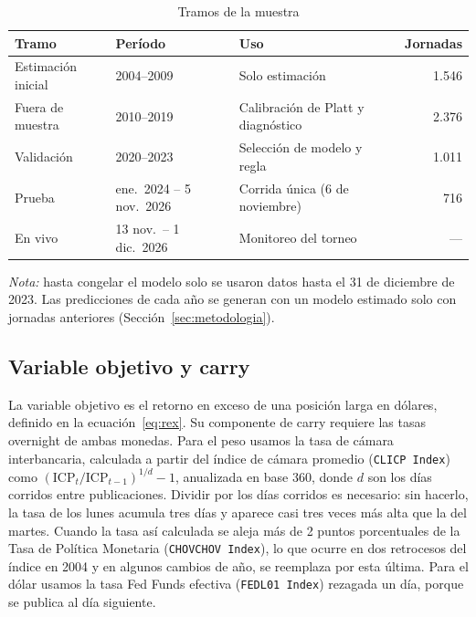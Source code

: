 \documentclass[11pt,a4paper]{article}
\begin{document}
\begin{table}[htbp]\centering
\caption{Tramos de la muestra}\label{tab:tramos}
\begin{threeparttable}
\begin{tabular}{lll r}
\toprule
Tramo & Período & Uso & Jornadas \\
\midrule
Estimación inicial & 2004--2009 & Solo estimación & 1.546 \\
Fuera de muestra & 2010--2019 & Calibración de Platt y diagnóstico & 2.376 \\
Validación & 2020--2023 & Selección de modelo y regla & 1.011 \\
Prueba & ene.\ 2024 -- 5 nov.\ 2026 & Corrida única (6 de noviembre) & 716 \\
En vivo & 13 nov.\ -- 1 dic.\ 2026 & Monitoreo del torneo & --- \\
\bottomrule
\end{tabular}
\begin{tablenotes}\footnotesize
\item \emph{Nota:} hasta congelar el modelo solo se usaron datos hasta el 31 de diciembre de 2023. Las predicciones de cada año se generan con un modelo estimado solo con jornadas anteriores (Sección~\ref{sec:metodologia}).
\end{tablenotes}
\end{threeparttable}
\end{table}

\subsection{Variable objetivo y carry}

La variable objetivo es el retorno en exceso de una posición larga en dólares, definido en la ecuación~\eqref{eq:rex}. Su componente de carry requiere las tasas overnight de ambas monedas. Para el peso usamos la tasa de cámara interbancaria, calculada a partir del índice de cámara promedio (\texttt{CLICP Index}) como $(\text{ICP}_t/\text{ICP}_{t-1})^{1/d}-1$, anualizada en base 360, donde $d$ son los días corridos entre publicaciones. Dividir por los días corridos es necesario: sin hacerlo, la tasa de los lunes acumula tres días y aparece casi tres veces más alta que la del martes. Cuando la tasa así calculada se aleja más de 2 puntos porcentuales de la Tasa de Política Monetaria (\texttt{CHOVCHOV Index}), lo que ocurre en dos retrocesos del índice en 2004 y en algunos cambios de año, se reemplaza por esta última. Para el dólar usamos la tasa Fed Funds efectiva (\texttt{FEDL01 Index}) rezagada un día, porque se publica al día siguiente.
\end{document}
